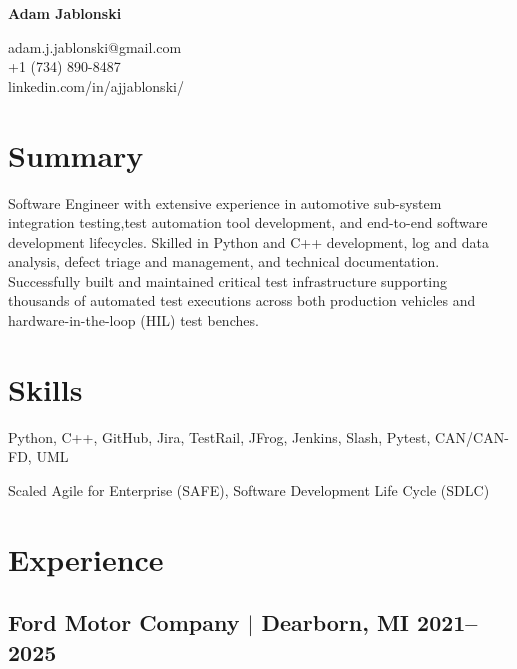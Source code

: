 \documentclass[10pt]{article}
\begin{document}
\pagestyle{empty}

\begin{center}
  \begin{minipage}{0.45\textwidth}
    {\Huge\bfseries
      Adam Jablonski
    }
  \end{minipage} \hfill
  \begin{minipage}{0.5\textwidth}
    \raggedleft
    adam.j.jablonski@gmail.com \\
    +1 (734) 890-8487 \\
    linkedin.com/in/ajjablonski/
  \end{minipage}
\end{center}

\section{Summary}
\noindent 
Software Engineer with extensive experience in automotive sub-system 
integration testing,test automation tool development, and end-to-end software 
development lifecycles. Skilled in Python and C++ development, log and data 
analysis, defect triage and management, and technical documentation. 
Successfully built and maintained critical test infrastructure supporting 
thousands of automated test executions across both production vehicles and 
hardware-in-the-loop (HIL) test benches.

\section{Skills}
\begin{description}[itemsep=0pt]
  \item[Technologies] Python, C++, GitHub, Jira, TestRail, JFrog, Jenkins, 
  Slash, Pytest, CAN/CAN-FD, UML
  \item[Practices] Scaled Agile for Enterprise (SAFE), Software Development 
  Life Cycle (SDLC)
\end{description}

\section{Experience}
\subsection{Ford Motor Company $|$ {\normalfont Dearborn, MI} \hfill 2021--2025}
\end{document}
